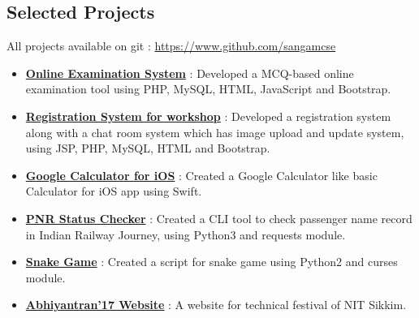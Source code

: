\documentclass[margin, centered]{res}
\begin{document}
\begin{resume}
    \section{Selected Projects}
    All projects available on git : \url{https://www.github.com/sangamcse}
    \begin{itemize}[leftmargin=*]
        \item \textbf{\href{https://github.com/sangamcse/online-examination-system}{Online Examination System}} :
              Developed a MCQ-based online examination tool using PHP, MySQL, HTML, JavaScript and Bootstrap.
        \item \textbf{\href{https://github.com/sangamcse/registration-ESAD}{Registration System for workshop}} :
              Developed a registration system along with a chat room system which has image upload and update system,
              using JSP, PHP, MySQL, HTML and Bootstrap.
        \item \textbf{\href{https://github.com/sangamcse/calculator}{Google Calculator for iOS}} : Created a Google
              Calculator like basic Calculator for iOS app using Swift.
        \item \textbf{\href{https://github.com/sangamcse/myPNRStatus}{PNR Status Checker}} : Created a CLI tool
              to check passenger name record in Indian Railway Journey, using Python3 and requests module.
        \item \textbf{\href{https://github.com/sangamcse/Snake_game}{Snake Game}} : Created a script for snake game using
              Python2 and curses module.
        \item \textbf{\href{http://abhiyantran.nitsikkim.ac.in/abhiyantran-17/}{Abhiyantran'17 Website}} : A website for technical festival of NIT Sikkim.
    \end{itemize}


\end{resume}
\end{document}
